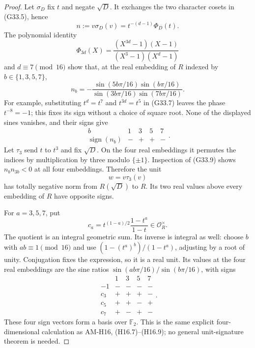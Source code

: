 \begin{proof}
Let $\sigma_D$ fix $t$ and negate $\sqrt D$.
It exchanges the two character cosets in (G33.5), hence
\[
 n:=v\sigma_D(v)=t^{-(d-1)}\Phi_D(t).                 \tag{G33.7}
\]
The polynomial identity
\[
 \Phi_{3d}(X)
       =\frac{(X^{3d}-1)(X-1)}{(X^3-1)(X^d-1)}
\]
and $d\equiv7\pmod {16}$ show that, at the real embedding
of $R$ indexed by $b\in\{1,3,5,7\}$,
\[
 n_b=-\frac{\sin(5b\pi/16)\sin(b\pi/16)}
                  {\sin(3b\pi/16)\sin(7b\pi/16)}.
                                                               \tag{G33.8}
\]
For example, substituting $t^d=t^7$ and $t^{3d}=t^5$
in (G33.7) leaves the phase $t^{-8}=-1$;
this fixes its sign without a choice of square root.
None of the displayed sines vanishes, and their signs give
\[
 \begin{array}{c|rrrr}
 b&1&3&5&7\\\hline
 \operatorname{sign}(n_b)&-&+&+&-
 \end{array}.                                                   \tag{G33.9}
\]
Let $\tau_3$ send $t$ to $t^3$ and fix $\sqrt D$.
On the four real embeddings it permutes the indices by
multiplication by three modulo $\{\pm1\}$.
Inspection of (G33.9) shows
$n_b n_{3b}<0$ at all four embeddings.
Therefore the unit
\[
                             w=v\tau_3(v)                      \tag{G33.10}
\]
has totally negative norm from $R(\sqrt D)$ to $R$.
Its two real values above every embedding of $R$ have
opposite signs.

For $a=3,5,7$, put
\[
 c_a=t^{(1-a)/2}\frac{1-t^a}{1-t}\in\mathcal O_R^\times.
                                                               \tag{G33.11}
\]
The quotient is an integral geometric sum.  Its inverse
is integral as well: choose $b$ with $ab\equiv1\pmod {16}$
and use $(1-(t^a)^b)/(1-t^a)$, adjusting by a root of unity.
Conjugation fixes the expression, so it is a real unit.
Its values at the four real embeddings are the sine ratios
$\sin(ab\pi/16)/\sin(b\pi/16)$, with signs
\[
 \begin{array}{c|rrrr}
 &1&3&5&7\\\hline
 -1&-&-&-&-\\
 c_3&+&+&+&-\\
 c_5&+&+&-&+\\
 c_7&+&-&+&-
 \end{array}.                                                   \tag{G33.12}
\]
These four sign vectors form a basis over $\mathbb F_2$.
This is the same explicit four-dimensional calculation as
AM-H16, (H16.7)--(H16.9); no general unit-signature theorem
is needed.


\end{proof}

